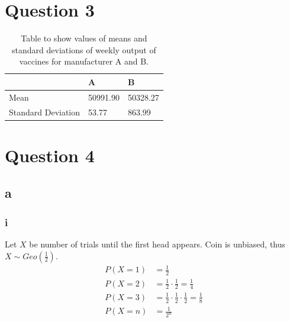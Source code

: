 \documentclass[11pt]{article}
\numberwithin{equation}{section}
\begin{document}
\section{Question 3}

\begin{table}[H]
    \centering
    \begin{tabular}{lll}
        \toprule
        & \textbf{A} & \textbf{B}\\
        \midrule
        Mean & 50991.90 & 50328.27\\
        Standard Deviation & 53.77 & 863.99\\
        \bottomrule
    \end{tabular}
    \caption{Table to show values of means and standard deviations of weekly output of vaccines for manufacturer A and B.}
\end{table}
\section{Question 4}
\subsection{a}
\subsubsection{i}
Let $X$ be number of trials until the first head appears. Coin is unbiased, thus $X \sim Geo\left(\frac{1}{2}\right)$.
\begin{align}
    P(X = 1) &= \frac{1}{2}\\
    P(X = 2) &= \frac{1}{2}\cdot\frac{1}{2} = \frac{1}{4}\\
    P(X = 3) &= \frac{1}{2}\cdot\frac{1}{2}\cdot\frac{1}{2} = \frac{1}{8}\\
    P(X = n) &= \frac{1}{2^n}
\end{align}
\end{document}
